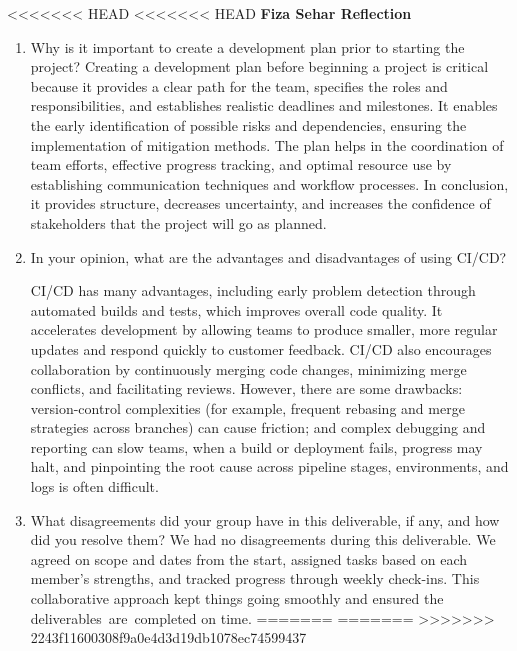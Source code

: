 \documentclass{article}
\begin{document}
<<<<<<< HEAD
<<<<<<< HEAD
\textbf{Fiza Sehar Reflection}
\begin{enumerate}
    \item Why is it important to create a development plan prior to starting the
    project?
    Creating a development plan before beginning a project is critical because it provides a clear path for the team, specifies the roles and responsibilities, and establishes realistic deadlines and milestones.  It enables the early identification of possible risks and dependencies, ensuring the implementation of mitigation methods.  The plan helps in the coordination of team efforts, effective progress tracking, and optimal resource use by establishing communication techniques and workflow processes.  In conclusion, it provides structure, decreases uncertainty, and increases the confidence of stakeholders that the project will go as planned.
    \item In your opinion, what are the advantages and disadvantages of using CI/CD?
    
    CI/CD has many advantages, including early problem detection through automated builds and tests, which improves overall code quality.  It accelerates development by allowing teams to produce smaller, more regular updates and respond quickly to customer feedback.  CI/CD also encourages collaboration by continuously merging code changes, minimizing merge conflicts, and facilitating reviews.  However, there are some drawbacks: version-control complexities (for example, frequent rebasing and merge strategies across branches) can cause friction; and complex debugging and reporting can slow teams, when a build or deployment fails, progress may halt, and pinpointing the root cause across pipeline stages, environments, and logs is often difficult.    \item What disagreements did your group have in this deliverable, if any,
    and how did you resolve them?
    We had no disagreements during this deliverable.  We agreed on scope and dates from the start, assigned tasks based on each member's strengths, and tracked progress through weekly check-ins.  This collaborative approach kept things going smoothly and ensured the deliverables are completed on time.
=======
=======
>>>>>>> 2243f11600308f9a0e4d3d19db1078ec74599437



\end{enumerate}
\end{document}
